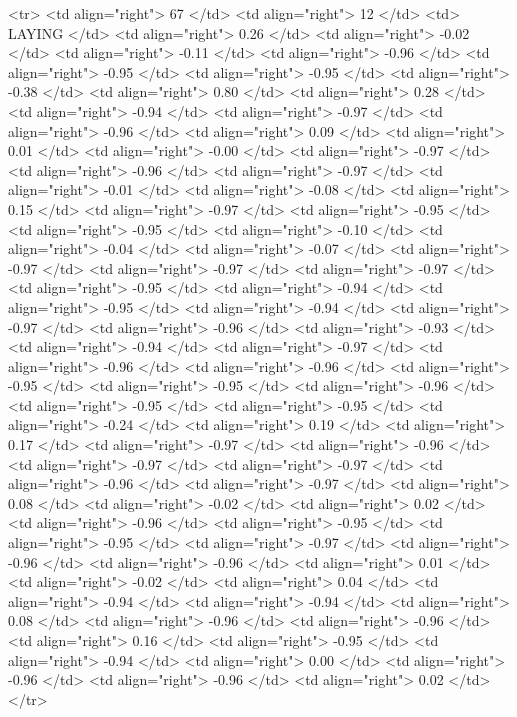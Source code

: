   <tr> <td align="right"> 67 </td> <td align="right">  12 </td> <td> LAYING </td> <td align="right"> 0.26 </td> <td align="right"> -0.02 </td> <td align="right"> -0.11 </td> <td align="right"> -0.96 </td> <td align="right"> -0.95 </td> <td align="right"> -0.95 </td> <td align="right"> -0.38 </td> <td align="right"> 0.80 </td> <td align="right"> 0.28 </td> <td align="right"> -0.94 </td> <td align="right"> -0.97 </td> <td align="right"> -0.96 </td> <td align="right"> 0.09 </td> <td align="right"> 0.01 </td> <td align="right"> -0.00 </td> <td align="right"> -0.97 </td> <td align="right"> -0.96 </td> <td align="right"> -0.97 </td> <td align="right"> -0.01 </td> <td align="right"> -0.08 </td> <td align="right"> 0.15 </td> <td align="right"> -0.97 </td> <td align="right"> -0.95 </td> <td align="right"> -0.95 </td> <td align="right"> -0.10 </td> <td align="right"> -0.04 </td> <td align="right"> -0.07 </td> <td align="right"> -0.97 </td> <td align="right"> -0.97 </td> <td align="right"> -0.97 </td> <td align="right"> -0.95 </td> <td align="right"> -0.94 </td> <td align="right"> -0.95 </td> <td align="right"> -0.94 </td> <td align="right"> -0.97 </td> <td align="right"> -0.96 </td> <td align="right"> -0.93 </td> <td align="right"> -0.94 </td> <td align="right"> -0.97 </td> <td align="right"> -0.96 </td> <td align="right"> -0.96 </td> <td align="right"> -0.95 </td> <td align="right"> -0.95 </td> <td align="right"> -0.96 </td> <td align="right"> -0.95 </td> <td align="right"> -0.95 </td> <td align="right"> -0.24 </td> <td align="right"> 0.19 </td> <td align="right"> 0.17 </td> <td align="right"> -0.97 </td> <td align="right"> -0.96 </td> <td align="right"> -0.97 </td> <td align="right"> -0.97 </td> <td align="right"> -0.96 </td> <td align="right"> -0.97 </td> <td align="right"> 0.08 </td> <td align="right"> -0.02 </td> <td align="right"> 0.02 </td> <td align="right"> -0.96 </td> <td align="right"> -0.95 </td> <td align="right"> -0.95 </td> <td align="right"> -0.97 </td> <td align="right"> -0.96 </td> <td align="right"> -0.96 </td> <td align="right"> 0.01 </td> <td align="right"> -0.02 </td> <td align="right"> 0.04 </td> <td align="right"> -0.94 </td> <td align="right"> -0.94 </td> <td align="right"> 0.08 </td> <td align="right"> -0.96 </td> <td align="right"> -0.96 </td> <td align="right"> 0.16 </td> <td align="right"> -0.95 </td> <td align="right"> -0.94 </td> <td align="right"> 0.00 </td> <td align="right"> -0.96 </td> <td align="right"> -0.96 </td> <td align="right"> 0.02 </td> </tr>
